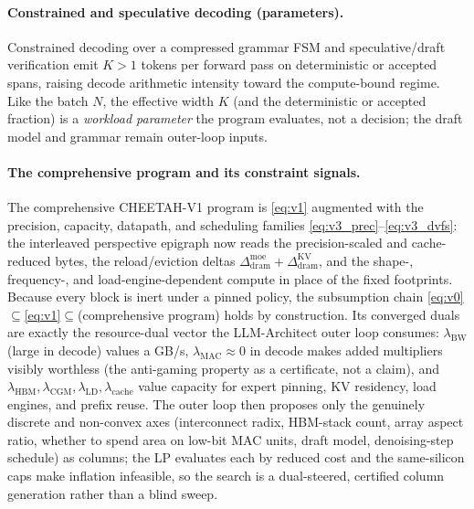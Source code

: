 \paragraph{Constrained and speculative decoding (parameters).}
Constrained decoding over a compressed grammar FSM \citep{zheng2024sglang} and
speculative/draft verification emit $K>1$ tokens per forward pass on deterministic
or accepted spans, raising decode arithmetic intensity toward the compute-bound
regime. Like the batch $N$, the effective width $K$ (and the deterministic or
accepted fraction) is a \emph{workload parameter} the program evaluates, not a
decision; the draft model and grammar remain outer-loop inputs.

\paragraph{The comprehensive program and its constraint signals.}
The comprehensive CHEETAH-V1 program is \eqref{eq:v1} augmented with the
precision, capacity, datapath, and scheduling families
\eqref{eq:v3_prec}--\eqref{eq:v3_dvfs}: the interleaved perspective epigraph now
reads the precision-scaled and cache-reduced bytes, the reload/eviction deltas
$\Delta^{\mathrm{moe}}_{\mathrm{dram}}+\Delta^{\mathrm{KV}}_{\mathrm{dram}}$,
and the shape-, frequency-, and load-engine-dependent compute in place of the
fixed footprints. Because every block is inert under a pinned policy, the
subsumption chain
\eqref{eq:v0}$\subseteq$\eqref{eq:v1}$\subseteq$(comprehensive program) holds by
construction. Its converged duals are exactly the resource-dual vector the
LLM-Architect outer loop consumes: $\lambda_{\mathrm{BW}}$ (large in decode)
values a GB/s, $\lambda_{\mathrm{MAC}}\!\approx\!0$ in decode makes added
multipliers visibly worthless (the anti-gaming property as a certificate, not a
claim), and $\lambda_{\mathrm{HBM}},\lambda_{\mathrm{CGM}},\lambda_{\mathrm{LD}},
\lambda_{\mathrm{cache}}$ value capacity for expert pinning, KV residency, load
engines, and prefix reuse. The outer loop then proposes only the genuinely
discrete and non-convex axes (interconnect radix, HBM-stack count, array aspect
ratio, whether to spend area on low-bit MAC units, draft model, denoising-step
schedule) as columns; the LP evaluates each by reduced cost and the same-silicon
caps make inflation infeasible, so the search is a dual-steered, certified column
generation rather than a blind sweep.

